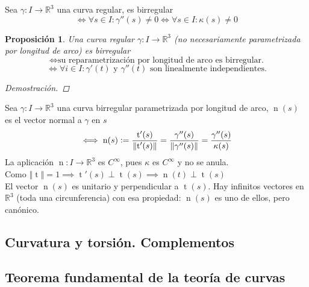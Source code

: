\documentclass[12pt]{article}
\theoremstyle{plain}
\newtheorem{prop}{Proposición}[subsection]
\newenvironment{dem}[1][]{%
  \begin{adjustwidth}{1cm}{0cm} \begin{proof}[Demostración\ifx\relax#1\relax\else{ (#1)}\fi]
}{\end{proof}\end{adjustwidth}}
\newcommand{\R}{\mathbb{R}}
\newcommand{\norm}[1]{\left\Vert#1\right\Vert}
\newcommand{\appl}[3]{#1 \colon #2 \longrightarrow #3}
\newcommand{\ds}{\displaystyle}
\newcommand{\tex}[1]{\text{#1}}
\newcommand{\defeq}{\vcentcolon=}
\newcommand{\tngnt}{\operatorname{t}}
\newcommand{\nrml}{\operatorname{n}}
\renewcommand{\norm}[1]{\left\Vert#1\right\Vert}
\begin{document}
\begin{defn}
    Sea $\appl{\gamma}{I}{\R^3}$ una curva regular, es birregular \[\ds\iff \forall s \in I : \gamma''(s) \ne 0 \iff\forall s \in I : \kappa(s)\ne 0\]
\end{defn}
\begin{prop}
    Una curva regular $\appl{\gamma}{I}{\R^3}$ (no necesariamente parametrizada por longitud de arco) es birregular \[\iff \tex{su reparametrización por longitud de arco es birregular.}\]
    \[\iff \forall i \in I : \gamma'(t)\tex{ y }\gamma''(t) \tex{ son linealmente independientes.}\]
    \begin{dem}
        
    \end{dem}
\end{prop}
\begin{defn}
    Sea $\appl{\gamma}{I}{\R^3}$ una curva birregular parametrizada por longitud de arco, $\operatorname{n}(s)$ es el vector normal a $\gamma$ en $s$
    \[\iff\operatorname{n}(s)\defeq\frac{\tngnt'(s)}{\norm{\tngnt'(s)}}= \frac{\gamma''(s)}{\norm{\gamma''(s)}}=\frac{\gamma''(s)}{\kappa(s)}\]
    La aplicación $\appl{\operatorname{n}}{I}{\R^3}$ es $C^\infty$, pues $\kappa$ es $C^\infty$ y no se anula. \\
    Como $\norm{\tngnt}=1\implies \tngnt'(s)\perp \tngnt(s) \implies \boxed{\nrml(t) \perp \tngnt(s)}$ \\
    El vector $\nrml(s)$ es unitario y perpendicular a $\tngnt(s)$. Hay infinitos vectores en $\R^3$ (toda una circunferencia) con esa propiedad: $\nrml(s)$ es uno de ellos, pero canónico.
\end{defn}
\begin{defn}
    
\end{defn}
\begin{defn}
    
\end{defn}
\begin{defn}
    
\end{defn}
\begin{defn}[Torsión]
    
\end{defn}
\begin{defn}[Planos]
    
\end{defn}

\subsection{Curvatura y torsión. Complementos}
\subsection{Teorema fundamental de la teoría de curvas}
\end{document}
